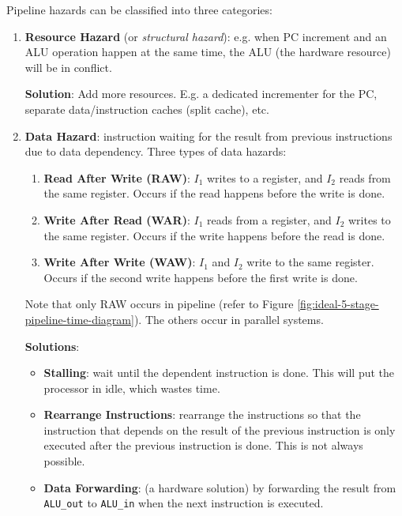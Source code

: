 Pipeline hazards can be classified into three categories:
\begin{enumerate}
    \item \textbf{Resource Hazard} (or \textit{structural hazard}): e.g. when PC increment and an ALU
        operation happen at the same time, the ALU (the hardware resource) will be in conflict.
    
        \textbf{Solution}: Add more resources. E.g. a dedicated incrementer for the PC,
        separate data/instruction caches (split cache), etc.

    \item \textbf{Data Hazard}: instruction waiting for the result from previous instructions due to
        data dependency. Three types of data hazards:
        \begin{enumerate}
            \item \textbf{Read After Write (RAW)}: $I_1$ writes to a register, and $I_2$ reads from the same
                register. Occurs if the read happens before the write is done.
            \item \textbf{Write After Read (WAR)}: $I_1$ reads from a register, and $I_2$ writes to the same
                register. Occurs if the write happens before the read is done.
            \item \textbf{Write After Write (WAW)}: $I_1$ and $I_2$ write to the same register.
                Occurs if the second write happens before the first write is done.
        \end{enumerate}
        Note that only RAW occurs in pipeline (refer to Figure \ref{fig:ideal-5-stage-pipeline-time-diagram}).
        The others occur in parallel systems.

        \textbf{Solutions}:
        \begin{itemize}
            \item \textbf{Stalling}: wait until the dependent instruction is done. This will put the
                processor in idle, which wastes time.
            \item \textbf{Rearrange Instructions}: rearrange the instructions so that the instruction
                that depends on the result of the previous instruction is only executed after the previous
                instruction is done. This is not always possible.
            \item \textbf{Data Forwarding}: (a hardware solution) by forwarding the result from
                \texttt{ALU\_out} to \texttt{ALU\_in} when the next instruction is executed.
        \end{itemize}


\end{enumerate}
